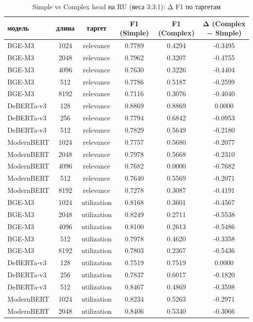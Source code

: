 \begin{table}
\caption{Simple vs Complex head на RU (веса 3:3:1): Δ F1 по таргетам}
\label{tab:simple_vs_complex}
\begin{tabular}{lccccc}
\toprule
модель & длина & таргет & F1 (Simple) & F1 (Complex) & Δ (Complex − Simple) \\
\midrule
BGE-M3 & 1024 & relevance & 0.7789 & 0.4294 & -0.3495 \\
BGE-M3 & 2048 & relevance & 0.7962 & 0.3207 & -0.4755 \\
BGE-M3 & 4096 & relevance & 0.7630 & 0.3226 & -0.4404 \\
BGE-M3 & 512 & relevance & 0.7786 & 0.5187 & -0.2599 \\
BGE-M3 & 8192 & relevance & 0.7116 & 0.3076 & -0.4040 \\
DeBERTa-v3 & 128 & relevance & 0.8869 & 0.8869 & 0.0000 \\
DeBERTa-v3 & 256 & relevance & 0.7794 & 0.6842 & -0.0953 \\
DeBERTa-v3 & 512 & relevance & 0.7829 & 0.5649 & -0.2180 \\
ModernBERT & 1024 & relevance & 0.7757 & 0.5680 & -0.2077 \\
ModernBERT & 2048 & relevance & 0.7978 & 0.5668 & -0.2310 \\
ModernBERT & 4096 & relevance & 0.7682 & 0.0000 & -0.7682 \\
ModernBERT & 512 & relevance & 0.7640 & 0.5569 & -0.2071 \\
ModernBERT & 8192 & relevance & 0.7278 & 0.3087 & -0.4191 \\
BGE-M3 & 1024 & utilization & 0.8168 & 0.3601 & -0.4567 \\
BGE-M3 & 2048 & utilization & 0.8249 & 0.2711 & -0.5538 \\
BGE-M3 & 4096 & utilization & 0.8100 & 0.2613 & -0.5486 \\
BGE-M3 & 512 & utilization & 0.7978 & 0.4620 & -0.3358 \\
BGE-M3 & 8192 & utilization & 0.7803 & 0.2367 & -0.5436 \\
DeBERTa-v3 & 128 & utilization & 0.7519 & 0.7519 & 0.0000 \\
DeBERTa-v3 & 256 & utilization & 0.7837 & 0.6017 & -0.1820 \\
DeBERTa-v3 & 512 & utilization & 0.8467 & 0.4869 & -0.3598 \\
ModernBERT & 1024 & utilization & 0.8234 & 0.5263 & -0.2971 \\
ModernBERT & 2048 & utilization & 0.8406 & 0.5340 & -0.3066 \\

\end{tabular}
\end{table}
